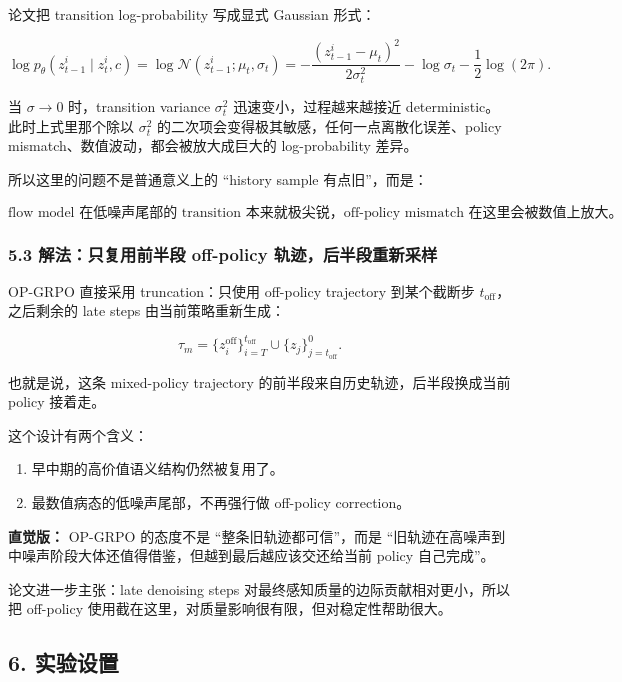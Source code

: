 论文把 transition log-probability 写成显式 Gaussian 形式：

\[
\log p_{\theta}(z_{t-1}^i \mid z_t^i, c)
=
\log \mathcal{N}(z_{t-1}^i; \mu_t, \sigma_t)
=
-\frac{(z_{t-1}^i-\mu_t)^2}{2\sigma_t^2}
-\log \sigma_t
-\frac{1}{2}\log(2\pi).
\]

当 \(\sigma \to 0\) 时，transition variance \(\sigma_t^2\) 迅速变小，过程越来越接近 deterministic。此时上式里那个除以 \(\sigma_t^2\) 的二次项会变得极其敏感，任何一点离散化误差、policy mismatch、数值波动，都会被放大成巨大的 log-probability 差异。

所以这里的问题不是普通意义上的 ``history sample 有点旧''，而是：

\[
\text{flow model 在低噪声尾部的 transition 本来就极尖锐，}
\text{off-policy mismatch 在这里会被数值上放大。}
\]

\subsubsection{5.3 解法：只复用前半段 off-policy 轨迹，后半段重新采样}

OP-GRPO 直接采用 truncation：只使用 off-policy trajectory 到某个截断步 \(t_{\mathrm{off}}\)，之后剩余的 late steps 由当前策略重新生成：

\[
\tau_m
=
\Big\{z_i^{\mathrm{off}}\Big\}_{i=T}^{t_{\mathrm{off}}}
\cup
\Big\{z_j\Big\}_{j=t_{\mathrm{off}}}^{0}.
\]

也就是说，这条 mixed-policy trajectory 的前半段来自历史轨迹，后半段换成当前 policy 接着走。

这个设计有两个含义：

\begin{enumerate}[leftmargin=1.5em]
  \item 早中期的高价值语义结构仍然被复用了。
  \item 最数值病态的低噪声尾部，不再强行做 off-policy correction。
\end{enumerate}

\begin{intubox}
\textbf{直觉版：} OP-GRPO 的态度不是 ``整条旧轨迹都可信''，而是 ``旧轨迹在高噪声到中噪声阶段大体还值得借鉴，但越到最后越应该交还给当前 policy 自己完成''。
\end{intubox}

论文进一步主张：late denoising steps 对最终感知质量的边际贡献相对更小，所以把 off-policy 使用截在这里，对质量影响很有限，但对稳定性帮助很大。

\subsection{6. 实验设置}

